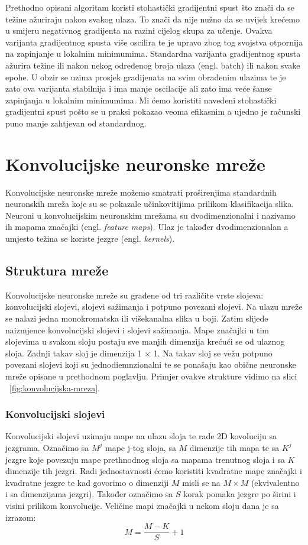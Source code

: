 \documentclass[times, utf8, zavrsni]{fer}
\begin{document}
Prethodno opisani algoritam koristi stohastički gradijentni spust što znači da se težine ažuriraju nakon svakog ulaza. To znači da nije nužno da se uvijek krećemo u smijeru negativnog gradijenta na razini cijelog skupa za učenje. Ovakva varijanta gradijentnog spusta više oscilira te je upravo zbog tog svojstva otpornija na zapinjanje u lokalnim minimumima. Standardna varijanta gradijentnog spusta ažurira težine ili nakon nekog određenog broja ulaza (engl. batch) ili nakon svake epohe. U obzir se uzima prosjek gradijenata na svim obrađenim ulazima te je zato ova varijanta stabilnija i ima manje oscilacije ali zato ima veće šanse zapinjanja u lokalnim minimumima. Mi ćemo koristiti navedeni stohastički gradijentni spust pošto se u praksi pokazao veoma efikasnim a ujedno je računski puno manje zahtjevan od standardnog.

\chapter{Konvolucijske neuronske mreže}
Konvolucijske neuronske mreže možemo smatrati proširenjima standardnih neuronskih mreža koje su se pokazale učinkovitijima prilikom klasifikacija slika. Neuroni u konvolucijskim neuronskim mrežama su dvodimenzionalni i nazivamo ih mapama značajki (engl. \textit{feature maps}). Ulaz je također dvodimenzionalan a umjesto težina se koriste jezgre (engl. \textit{kernels}).

\section{Struktura mreže}
Konvolucijske neuronske mreže su građene od tri različite vrste slojeva: konvolucijski slojevi, slojevi sažimanja i potpuno povezani slojevi. Na ulazu mreže se nalazi jedna monokromatska ili višekanalna slika u boji. Zatim slijede naizmjence konvolucijski slojevi i slojevi sažimanja. Mape značajki u tim slojevima u svakom sloju postaju sve manjih dimenzija krećući se od ulaznog sloja. Zadnji takav sloj je dimenzija 1 $\times$ 1. Na takav sloj se vežu potpuno povezani slojevi koji su jednodiemnzionalni te se ponašaju kao obične neuronske mreže opisane u prethodnom poglavlju. Primjer ovakve strukture vidimo na slici ~\ref{fig:konvolucijska-mreza}.
\subsection{Konvolucijski slojevi}
Konvolucijski slojevi uzimaju mape na ulazu sloja te rade 2D kovoluciju sa jezgrama. Označimo sa $M^j$ mape j-tog sloja, sa $M$ dimenzije tih mapa te sa $K^j$ jezgre koje povezuju mape prethnodnog sloja sa mapama trenutnog sloja i sa $K$ dimenzije tih jezgri. Radi jednostavnosti ćemo koristiti kvadratne mape značajki i kvadratne jezgre te kad govorimo o dimenziji $M$ misli se na $M \times M$ (ekvivalentno i sa dimenzijama jezgri). Također označimo sa $S$ korak pomaka jezgre po širini i visini prilikom konvolucije. Veličine mapi značajki u nekom sloju dana je sa izrazom:
\begin{equation}
M = \frac{M - K}{S} + 1
\end{equation}
\end{document}
